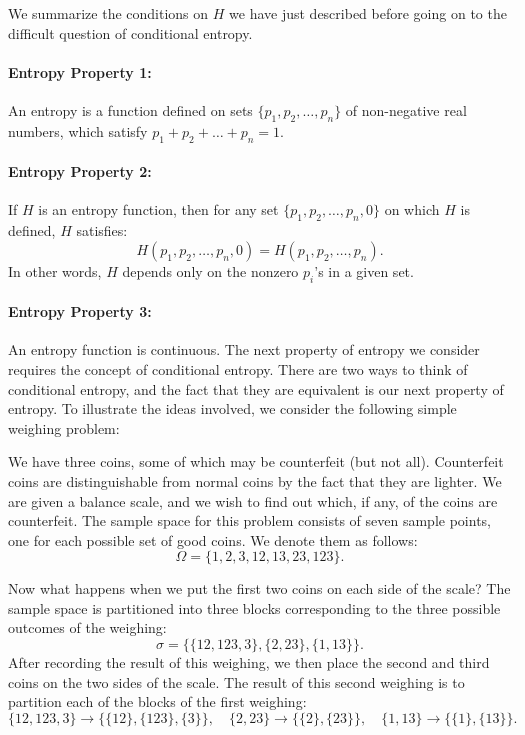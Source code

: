 \documentclass{report}
\begin{document}
We summarize the conditions on \( H \) we have just described before going on to the difficult question of conditional entropy.

\paragraph{Entropy Property 1:} 
An entropy is a function defined on sets \( \{p_1, p_2, \ldots, p_n\} \) of non-negative real numbers, which satisfy \( p_1 + p_2 + \ldots + p_n = 1 \).

\paragraph{Entropy Property 2:} 
If \( H \) is an entropy function, then for any set \( \{p_1, p_2, \ldots, p_n, 0\} \) on which \( H \) is defined, \( H \) satisfies:
\[
H(p_1, p_2, \ldots, p_n, 0) = H(p_1, p_2, \ldots, p_n).
\]
In other words, \( H \) depends only on the nonzero \( p_i \)'s in a given set.

\paragraph{Entropy Property 3:} 
An entropy function is continuous.
The next property of entropy we consider requires the concept of conditional entropy. There are two ways to think of conditional entropy, and the fact that they are equivalent is our next property of entropy. To illustrate the ideas involved, we consider the following simple weighing problem:

We have three coins, some of which may be counterfeit (but not all). Counterfeit coins are distinguishable from normal coins by the fact that they are lighter. We are given a balance scale, and we wish to find out which, if any, of the coins are counterfeit. The sample space for this problem consists of seven sample points, one for each possible set of good coins. We denote them as follows:
\[
\Omega = \{1, 2, 3, 12, 13, 23, 123\}.
\]

Now what happens when we put the first two coins on each side of the scale? The sample space is partitioned into three blocks corresponding to the three possible outcomes of the weighing:
\[
\sigma = \{\{12, 123, 3\}, \{2, 23\}, \{1, 13\}\}.
\]
After recording the result of this weighing, we then place the second and third coins on the two sides of the scale. The result of this second weighing is to partition each of the blocks of the first weighing:
\[
\{12, 123, 3\} \to \{\{12\}, \{123\}, \{3\}\}, \quad 
\{2, 23\} \to \{\{2\}, \{23\}\}, \quad 
\{1, 13\} \to \{\{1\}, \{13\}\}.
\]
\end{document}

